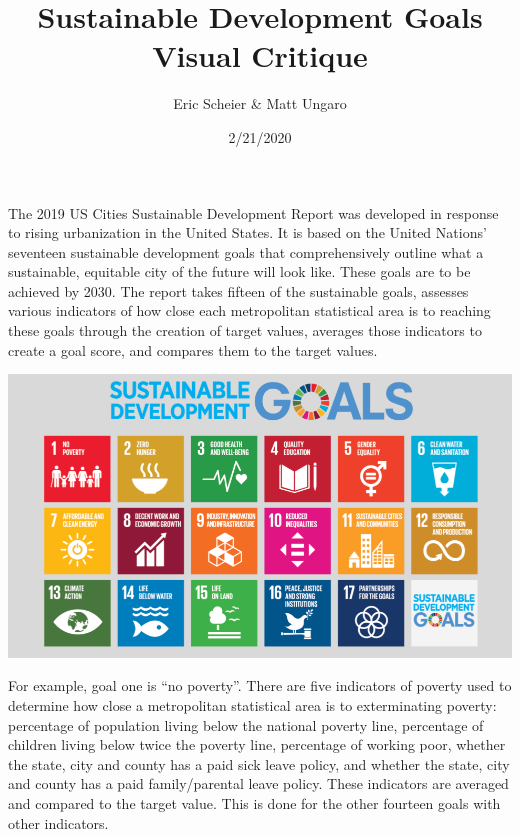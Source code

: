 \documentclass[]{article}
\title{Sustainable Development Goals Visual Critique}
\author{Eric Scheier \& Matt Ungaro}
\date{2/21/2020}
\begin{document}
\maketitle

The 2019 US Cities Sustainable Development Report was developed in
response to rising urbanization in the United States. It is based on the
United Nations' seventeen sustainable development goals that
comprehensively outline what a sustainable, equitable city of the future
will look like. These goals are to be achieved by 2030. The report takes
fifteen of the sustainable goals, assesses various indicators of how
close each metropolitan statistical area is to reaching these goals
through the creation of target values, averages those indicators to
create a goal score, and compares them to the target values.

\includegraphics[width=\textwidth,height=\textheight]{sdgs}

For example, goal one is ``no poverty''. There are five indicators of
poverty used to determine how close a metropolitan statistical area is
to exterminating poverty: percentage of population living below the
national poverty line, percentage of children living below twice the
poverty line, percentage of working poor, whether the state, city and
county has a paid sick leave policy, and whether the state, city and
county has a paid family/parental leave policy. These indicators are
averaged and compared to the target value. This is done for the other
fourteen goals with other indicators.
\end{document}
